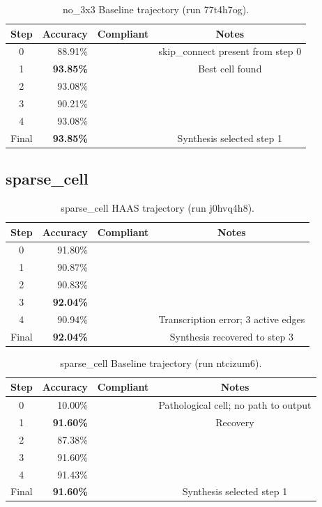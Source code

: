 \documentclass[10pt]{article}
\newcommand{\cmark}{\ding{51}}
\newcommand{\xmark}{\ding{55}}
\begin{document}
\begin{table}[H]
\caption{no\_3x3 Baseline trajectory (run 77t4h7og).}
\begin{center}
\small
\begin{tabular}{crcc}
\toprule
Step & Accuracy & Compliant & Notes \\
\midrule
0     & 88.91\% & \xmark & skip\_connect present from step 0 \\
1     & \textbf{93.85\%} & \xmark & Best cell found \\
2     & 93.08\% & \xmark & \\
3     & 90.21\% & \xmark & \\
4     & 93.08\% & \xmark & \\
Final & \textbf{93.85\%} & \xmark & Synthesis selected step 1 \\
\bottomrule
\end{tabular}
\end{center}
\end{table}

\subsection{sparse\_cell}

\begin{table}[H]
\caption{sparse\_cell HAAS trajectory (run j0hvq4h8).}
\begin{center}
\small
\begin{tabular}{crcc}
\toprule
Step & Accuracy & Compliant & Notes \\
\midrule
0     & 91.80\% & \cmark &\\
1     & 90.87\% & \cmark &\\
2     & 90.83\% & \cmark &\\
3     & \textbf{92.04\%} & \cmark &\\
4     & 90.94\% & \xmark & Transcription error; 3 active edges \\
Final & \textbf{92.04\%} & \cmark &Synthesis recovered to step 3 \\
\bottomrule
\end{tabular}
\end{center}
\end{table}

\begin{table}[H]
\caption{sparse\_cell Baseline trajectory (run ntcizum6).}
\begin{center}
\small
\begin{tabular}{crcc}
\toprule
Step & Accuracy & Compliant & Notes \\
\midrule
0     & 10.00\% & \xmark & Pathological cell; no path to output \\
1     & \textbf{91.60\%} & \xmark & Recovery \\
2     & 87.38\% & \xmark & \\
3     & 91.60\% & \xmark & \\
4     & 91.43\% & \xmark & \\
Final & \textbf{91.60\%} & \xmark & Synthesis selected step 1 \\
\bottomrule
\end{tabular}
\end{center}
\end{table}
\end{document}
